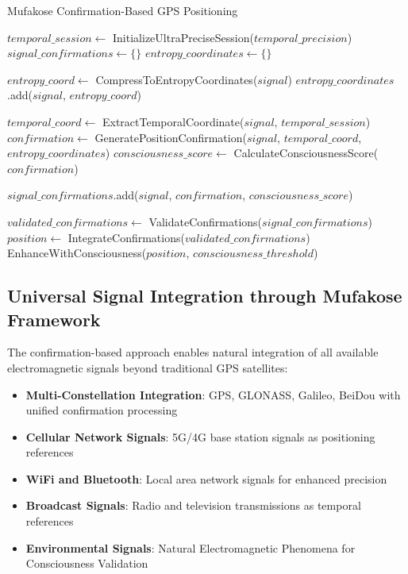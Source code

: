 \documentclass[12pt,a4paper]{article}
\begin{document}
\begin{algorithm}
\caption{Mufakose Confirmation-Based GPS Positioning}
\begin{algorithmic}[1]
    \State $temporal\_session \gets$ InitializeUltraPreciseSession($temporal\_precision$)
    \State $signal\_confirmations \gets \{\}$
    \State $entropy\_coordinates \gets \{\}$
    
        \State $entropy\_coord \gets$ CompressToEntropyCoordinates($signal$)
        \State $entropy\_coordinates$.add($signal$, $entropy\_coord$)
    \EndFor
    
        \State $temporal\_coord \gets$ ExtractTemporalCoordinate($signal$, $temporal\_session$)
        \State $confirmation \gets$ GeneratePositionConfirmation($signal$, $temporal\_coord$, $entropy\_coordinates$)
        \State $consciousness\_score \gets$ CalculateConsciousnessScore($confirmation$)
        
            \State $signal\_confirmations$.add($signal$, $confirmation$, $consciousness\_score$)
        \EndIf
    \EndFor
    
    \State $validated\_confirmations \gets$ ValidateConfirmations($signal\_confirmations$)
    \State $position \gets$ IntegrateConfirmations($validated\_confirmations$)
    \State \Return EnhanceWithConsciousness($position$, $consciousness\_threshold$)
\EndProcedure
\end{algorithmic}
\end{algorithm}

\subsection{Universal Signal Integration through Mufakose Framework}

The confirmation-based approach enables natural integration of all available electromagnetic signals beyond traditional GPS satellites:

\begin{itemize}
\item \textbf{Multi-Constellation Integration}: GPS, GLONASS, Galileo, BeiDou with unified confirmation processing
\item \textbf{Cellular Network Signals}: 5G/4G base station signals as positioning references
\item \textbf{WiFi and Bluetooth}: Local area network signals for enhanced precision
\item \textbf{Broadcast Signals}: Radio and television transmissions as temporal references
\item \textbf{Environmental Signals}: Natural Electromagnetic Phenomena for Consciousness Validation
\end{itemize}
\end{document}
